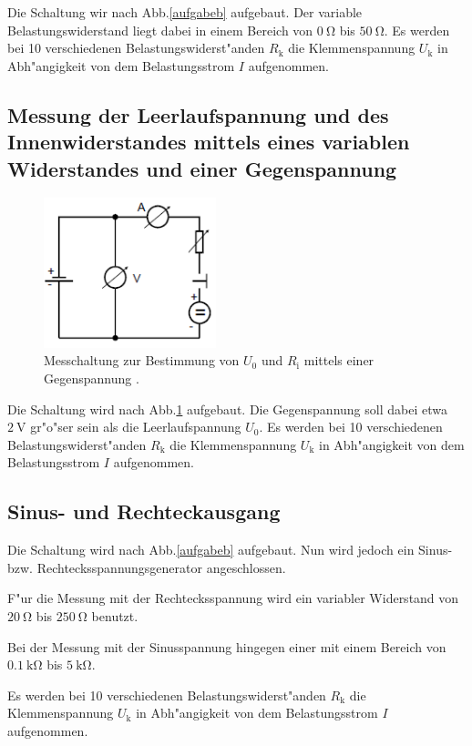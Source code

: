 Die Schaltung wir nach Abb.\ref{aufgabeb} aufgebaut.
Der variable Belastungswiderstand liegt dabei in einem Bereich von $\SI{0}{\ohm}$ bis $\SI{50}{\ohm}$. Es werden bei 10 verschiedenen Belastungswiderst"anden $R_\mathrm{k}$ die Klemmenspannung $U_\mathrm{k}$ in Abh"angigkeit von dem Belastungsstrom $I$ aufgenommen.

\subsection{Messung der Leerlaufspannung und des Innenwiderstandes mittels eines variablen Widerstandes und einer Gegenspannung} %
\label{sub:messung_der_leerlaufspannung_mittels_eines_variablen_widerstandes_}

\begin{figure}
	\centering
	\includegraphics[width = 5cm]{img/c.PNG}
	\caption{Messchaltung zur Bestimmung von $U_\mathrm{0}$ und $R_\mathrm{i}$ mittels einer Gegenspannung \cite{anleitung}.}
	\label{aufgabec}
\end{figure}

Die Schaltung wird nach Abb.\ref{aufgabec} aufgebaut.
Die Gegenspannung soll dabei etwa $\SI{2}{\volt}$ gr"o"ser sein als die Leerlaufspannung $U_\mathrm{0}$.
Es werden bei 10 verschiedenen Belastungswiderst"anden $R_\mathrm{k}$ die Klemmenspannung $U_\mathrm{k}$ in Abh"angigkeit von dem Belastungsstrom $I$ aufgenommen.

\subsection{Sinus- und Rechteckausgang} %
\label{sub:sinus_und_rechteckausgang}

Die Schaltung wird nach Abb.\ref{aufgabeb} aufgebaut.
Nun wird jedoch ein Sinus- bzw. Rechtecksspannungsgenerator angeschlossen.

F"ur die Messung mit der Rechtecksspannung wird ein variabler Widerstand von $\SI{20}{\ohm}$ bis $\SI{250}{\ohm}$ benutzt.

Bei der Messung mit der Sinusspannung hingegen einer mit einem Bereich von $\SI{0.1}{\kilo\ohm}$ bis $\SI{5}{\kilo\ohm}$.

Es werden bei 10 verschiedenen Belastungswiderst"anden $R_\mathrm{k}$ die Klemmenspannung $U_\mathrm{k}$ in Abh"angigkeit von dem Belastungsstrom $I$ aufgenommen.